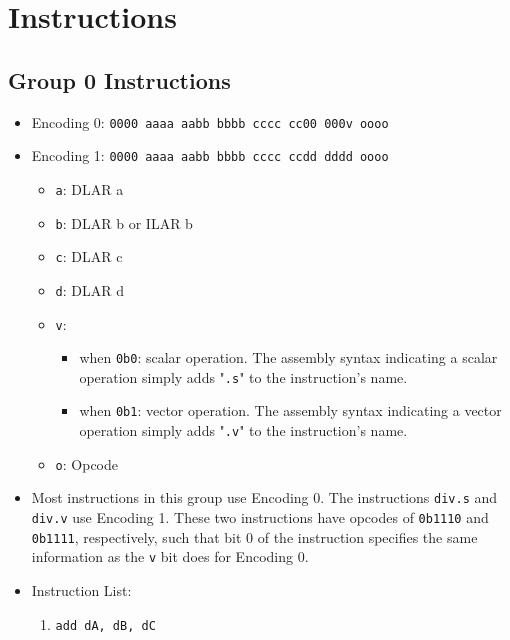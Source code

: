 \documentclass{article}
\begin{document}
\section{Instructions}
	\subsection{Group 0 Instructions}
		\begin{itemize}
		\item Encoding 0: \texttt{0000 aaaa aabb bbbb  cccc cc00 000v oooo}
		\item Encoding 1: \texttt{0000 aaaa aabb bbbb  cccc ccdd dddd oooo}
			\begin{itemize}
			\item \texttt{a}: DLAR a
			\item \texttt{b}: DLAR b or ILAR b
			\item \texttt{c}: DLAR c
			\item \texttt{d}: DLAR d
			\item \texttt{v}:
				\begin{itemize}
				\item when \texttt{0b0}: scalar operation. The assembly
					syntax indicating a scalar operation simply adds
					"\texttt{.s}" to the instruction's name.
				\item when \texttt{0b1}: vector operation. The assembly
					syntax indicating a vector operation simply adds
					"\texttt{.v}" to the instruction's name.
				\end{itemize}
			\item \texttt{o}: Opcode
			\end{itemize}
		\item Most instructions in this group use Encoding 0.
			The instructions \texttt{div.s} and \texttt{div.v} use Encoding
			1. These two instructions have opcodes of \texttt{0b1110} and
			\texttt{0b1111}, respectively, such that bit 0 of the
			instruction specifies the same information as the \texttt{v}
			bit does for Encoding 0.
		\item Instruction List:
			\begin{enumerate}
			\item \texttt{add dA, dB, dC}

\end{enumerate}
\end{itemize}
\end{document}
